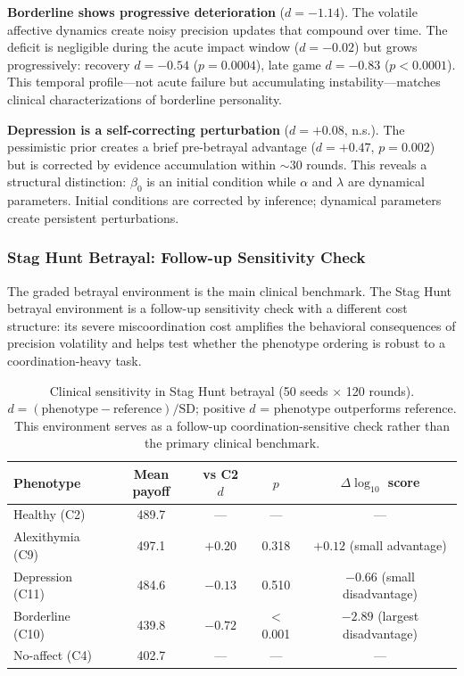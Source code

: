 \documentclass[11pt,a4paper]{article}
\begin{document}
\textbf{Borderline shows progressive deterioration} ($d = -1.14$). The volatile affective dynamics create noisy precision updates that compound over time. The deficit is negligible during the acute impact window ($d = -0.02$) but grows progressively: recovery $d = -0.54$ ($p = 0.0004$), late game $d = -0.83$ ($p < 0.0001$). This temporal profile---not acute failure but accumulating instability---matches clinical characterizations of borderline personality.

\textbf{Depression is a self-correcting perturbation} ($d = +0.08$, n.s.). The pessimistic prior creates a brief pre-betrayal advantage ($d = +0.47$, $p = 0.002$) but is corrected by evidence accumulation within $\sim\!30$ rounds. This reveals a structural distinction: $\beta_0$ is an initial condition while $\alpha$ and $\lambda$ are dynamical parameters. Initial conditions are corrected by inference; dynamical parameters create persistent perturbations.

\subsubsection{Stag Hunt Betrayal: Follow-up Sensitivity Check}

The graded betrayal environment is the main clinical benchmark. The Stag Hunt betrayal environment is a follow-up sensitivity check with a different cost structure: its severe miscoordination cost amplifies the behavioral consequences of precision volatility and helps test whether the phenotype ordering is robust to a coordination-heavy task.

\begin{table}[ht]
\centering\small
\begin{tabular}{lcccc}
\toprule
Phenotype & Mean payoff & vs C2 $d$ & $p$ & $\Delta \log_{10}$ score \\
\midrule
Healthy (C2) & 489.7 & --- & --- & --- \\
Alexithymia (C9) & 497.1 & $+0.20$ & 0.318 & $+0.12$ (small advantage) \\
Depression (C11) & 484.6 & $-0.13$ & 0.510 & $-0.66$ (small disadvantage) \\
Borderline (C10) & 439.8 & $-0.72$ & $<$0.001 & $-2.89$ (largest disadvantage) \\
No-affect (C4) & 402.7 & --- & --- & --- \\
\bottomrule
\end{tabular}
\caption{Clinical sensitivity in Stag Hunt betrayal (50 seeds $\times$ 120 rounds). $d = (\text{phenotype} - \text{reference})/\text{SD}$; positive $d$ = phenotype outperforms reference. This environment serves as a follow-up coordination-sensitive check rather than the primary clinical benchmark.}
\label{tab:clinical_sh}
\end{table}
\end{document}
